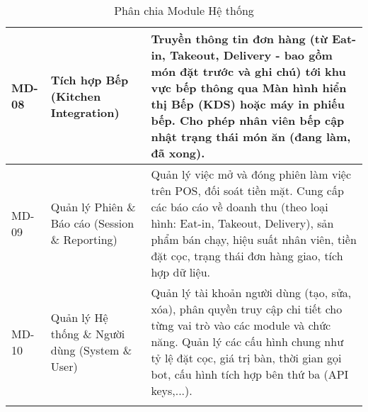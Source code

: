 \begin{longtable}{|m{1.5cm}|m{4.5cm}|m{9cm}|}
\hline
MD-08 & Tích hợp Bếp (Kitchen Integration) & Truyền thông tin đơn hàng (từ Eat-in, Takeout, Delivery - bao gồm món đặt trước và ghi chú) tới khu vực bếp thông qua Màn hình hiển thị Bếp (KDS) hoặc máy in phiếu bếp. Cho phép nhân viên bếp cập nhật trạng thái món ăn (đang làm, đã xong). \\
\hline
MD-09 & Quản lý Phiên \& Báo cáo (Session \& Reporting) & Quản lý việc mở và đóng phiên làm việc trên POS, đối soát tiền mặt. Cung cấp các báo cáo về doanh thu (theo loại hình: Eat-in, Takeout, Delivery), sản phẩm bán chạy, hiệu suất nhân viên, tiền đặt cọc, trạng thái đơn hàng giao, tích hợp dữ liệu. \\
\hline
MD-10 & Quản lý Hệ thống \& Người dùng (System \& User) & Quản lý tài khoản người dùng (tạo, sửa, xóa), phân quyền truy cập chi tiết cho từng vai trò vào các module và chức năng. Quản lý các cấu hình chung như tỷ lệ đặt cọc, giá trị bàn, thời gian gọi bot, cấu hình tích hợp bên thứ ba (API keys,...). \\
\hline
\caption{Phân chia Module Hệ thống} \label{tab:modules} \\

\end{longtable}













